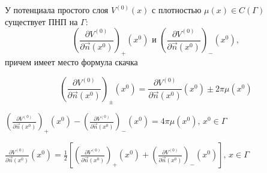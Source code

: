 \begin{theorem}
У потенциала простого слоя $V^{(0)}(x)$ с плотностью $\mu(x) \in C(\Gamma)$ существует ПНП на $\Gamma$: $$\left( \frac{\partial V^{(0)}}{\partial \vec{n}(x^0)}\right)_+(x^0)
\text{ и } \left(\frac{\partial V^{(0)}}{\partial \vec{n}(x^0)}\right)_-(x^0) ,$$
причем имеет место формула скачка 

$$\left(\frac{\partial V^{(0)}}{\partial \vec{n}(x^0)}\right)_{\pm}(x^0) = \frac{\partial V^{(0)}}{\partial \vec{n}(x^0)}(x^0) \pm 2\pi \mu(x^0) $$
\end{theorem}
\begin{conseq}
$\left(\frac{\partial V^{(0)}}{\partial \vec{n}(x^0)} \right)_+(x^0) - \left(\frac{\partial V^{(0)}}{\partial \vec{n}(x^0)} \right)_-(x^0) = 4\pi \mu(x^0), \, x^0 \in \Gamma$

$\frac{\partial V^{(0)}}{\partial \vec{n}(x^0)}(x^0) = \frac{1}{2} \left[ \left(\frac{\partial V^{(0)}}{\partial \vec{n}(x^0)} \right)_+(x^0) + \left(\frac{\partial V^{(0)}}{\partial \vec{n}(x^0)} \right)_-(x^0)\right], \, x \in \Gamma$
\end{conseq}
